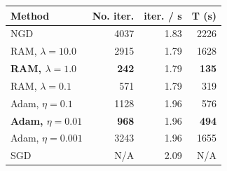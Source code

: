                \begin{tabular}{lrrr}
                    \textbf{Method}
                    & \textbf{No. iter.}
                    & \textbf{iter. / s}
                    & \textbf{T (s)} \\
                    \hline
                    NGD
                    & 4037
                    & 1.83
                    & 2226 \\
                    RAM, $\lambda = 10.0$
                    & 2915
                    & 1.79
                    & 1628 \\
                    \textbf{RAM, $\lambda = 1.0$}
                    & \textbf{242}
                    & 1.79
                    & \textbf{135} \\
                    RAM, $\lambda = 0.1$
                    & 571
                    & 1.79
                    & 319 \\
                    Adam, $\eta = 0.1$
                    & 1128
                    & 1.96
                    & 576 \\
                    \textbf{Adam, $\eta = 0.01$}
                    & \textbf{968}
                    & 1.96
                    & \textbf{494} \\
                    Adam, $\eta = 0.001$
                    & 3243
                    & 1.96
                    & 1655 \\
                    SGD
                    & N/A
                    & 2.09
                    & N/A \\
                \end{tabular}%
